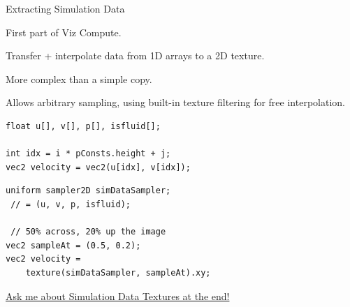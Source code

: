 \begin{frame}[fragile]{Extracting Simulation Data}

    \begin{minipage}{0.48\textwidth}
       \begin{wideitemize}
            \item First part of Viz Compute.
            \item Transfer + interpolate data from 1D arrays to a 2D texture.
            \item More complex than a simple copy. %
            \item Allows arbitrary sampling, using built-in texture filtering for free interpolation.
        \end{wideitemize}
    \end{minipage}\hfill%
    \begin{minipage}{0.5\textwidth}
    \lstset{language=glsl}
        \begin{lstlisting}
float u[], v[], p[], isfluid[];

int idx = i * pConsts.height + j;
vec2 velocity = vec2(u[idx], v[idx]);\end{lstlisting}

        
        \begin{lstlisting}
uniform sampler2D simDataSampler;
 // = (u, v, p, isfluid);
 
 // 50% across, 20% up the image
vec2 sampleAt = (0.5, 0.2);
vec2 velocity = 
    texture(simDataSampler, sampleAt).xy;\end{lstlisting}

    \end{minipage}
    

    \vfill\null
    \begin{center}
        \hyperlink{frame:simdatatex}{Ask me about Simulation Data Textures at the end!}
    \end{center}
\end{frame}

